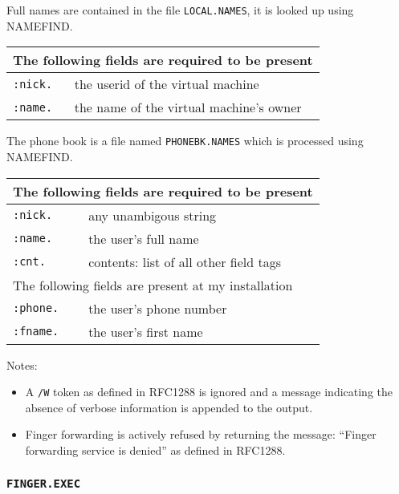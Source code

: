   Full names are contained in the file {\tt LOCAL.NAMES}, it is looked up
  using NAMEFIND.\\
\rule{0mm}{2mm}

\begin{tabular}{|l|l|}\hline
\multicolumn{2}{|l|}{The following fields are required to be present}\\ \hline
  {\tt :nick. }    &   the userid of the virtual machine\\
  {\tt :name. }    &   the name of the virtual machine's owner\\
\hline
\end{tabular}

\rule{0mm}{5mm}

  The phone book is a file named {\tt PHONEBK.NAMES} which is processed using
  NAMEFIND.\\
\rule{0mm}{2mm}

\begin{tabular}{|l|l|}\hline
\multicolumn{2}{|l|}{The following fields are required to be present}\\ \hline
  {\tt :nick. }     & any unambigous string\\
  {\tt :name. }     & the user's full name\\
  {\tt :cnt.  }     & contents: list of all other field tags\\
\hline\hline
\multicolumn{2}{|l|}{The following fields are present at my installation}\\
\hline
  {\tt :phone. }    & the user's phone number\\
  {\tt :fname. }    & the user's first name\\
\hline
\end{tabular}

\rule{0mm}{5mm}

\noindent Notes:
\begin{itemize}
\item  A {\tt /W} token as defined in RFC1288 is
     ignored and a message indicating
     the absence of verbose information is appended to the output.
\item  Finger forwarding is actively refused by returning the message:
     ``Finger forwarding service is denied'' as defined in RFC1288.
\end{itemize}
 


\subsubsection{{\tt FINGER.EXEC}}
 
